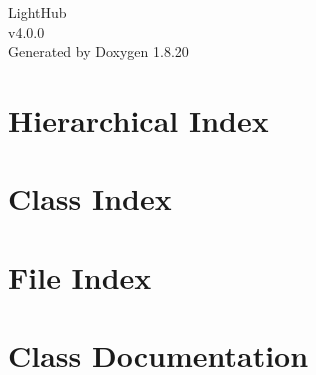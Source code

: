 \let\mypdfximage\pdfximage\def\pdfximage{\immediate\mypdfximage}\documentclass[twoside]{book}
\newcommand{\+}{\discretionary{\mbox{\scriptsize$\hookleftarrow$}}{}{}}
\newcommand{\clearemptydoublepage}{%
  \newpage{\pagestyle{empty}\cleardoublepage}%
}
\begin{document}
\hypersetup{pageanchor=false,
             bookmarksnumbered=true,
             pdfencoding=unicode
            }
\begin{titlepage}
\vspace*{7cm}
\begin{center}%
{\Large Light\+Hub \\[1ex]\large v4.\+0.\+0 }\\
\vspace*{1cm}
{\large Generated by Doxygen 1.8.20}\\
\end{center}
\end{titlepage}
\clearemptydoublepage
{}
\tableofcontents
\clearemptydoublepage
{}
\hypersetup{pageanchor=true}

\chapter{Hierarchical Index}

\chapter{Class Index}

\chapter{File Index}

\chapter{Class Documentation}




































\end{document}
